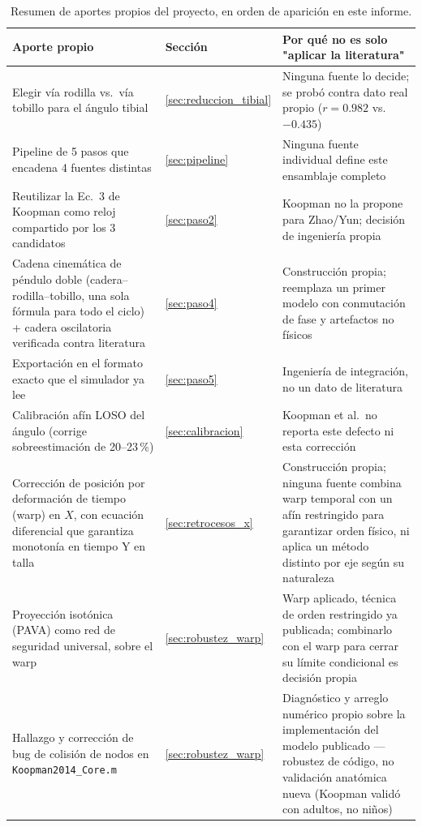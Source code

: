 \documentclass[11pt,a4paper]{scrartcl}
\begin{document}
\begin{table}[H]
\centering
\caption{Resumen de aportes propios del proyecto, en orden de aparición en este informe.}
\label{tab:aportes}
\small
\begin{tabular}{@{}p{4.6cm}p{1.6cm}p{7.4cm}@{}}
\toprule
Aporte propio & Sección & Por qué no es solo "aplicar la literatura" \\
\midrule
Elegir vía rodilla vs.\ vía tobillo para el ángulo tibial & \ref{sec:reduccion_tibial} & Ninguna fuente lo decide; se probó contra dato real propio ($r=0.982$ vs.\ $-0.435$) \\
Pipeline de 5 pasos que encadena 4 fuentes distintas & \ref{sec:pipeline} & Ninguna fuente individual define este ensamblaje completo \\
Reutilizar la Ec.\ 3 de Koopman como reloj compartido por los 3 candidatos & \ref{sec:paso2} & Koopman no la propone para Zhao/Yun; decisión de ingeniería propia \\
Cadena cinemática de péndulo doble (cadera--rodilla--tobillo, una sola fórmula para todo el ciclo) + cadera oscilatoria verificada contra literatura & \ref{sec:paso4} & Construcción propia; reemplaza un primer modelo con conmutación de fase y artefactos no físicos \\
Exportación en el formato exacto que el simulador ya lee & \ref{sec:paso5} & Ingeniería de integración, no un dato de literatura \\
Calibración afín LOSO del ángulo (corrige sobreestimación de 20--23\,\%) & \ref{sec:calibracion} & Koopman et al.\ no reporta este defecto ni esta corrección \\
Corrección de posición por deformación de tiempo (warp) en $X$, con ecuación diferencial que garantiza monotonía en tiempo Y en talla & \ref{sec:retrocesos_x} & Construcción propia; ninguna fuente combina warp temporal con un afín restringido para garantizar orden físico, ni aplica un método distinto por eje según su naturaleza \\
Proyección isotónica (PAVA) como red de seguridad universal, sobre el warp & \ref{sec:robustez_warp} & Warp aplicado, técnica de orden restringido ya publicada; combinarlo con el warp para cerrar su límite condicional es decisión propia \\
Hallazgo y corrección de bug de colisión de nodos en \texttt{Koopman2014\_Core.m} & \ref{sec:robustez_warp} & Diagnóstico y arreglo numérico propio sobre la implementación del modelo publicado --- robustez de código, no validación anatómica nueva (Koopman validó con adultos, no niños) \\

\end{tabular}
\end{table}
\end{document}
